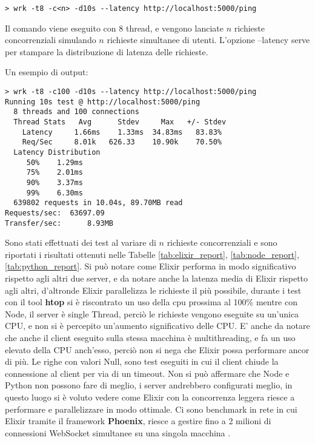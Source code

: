 \begin{lstlisting}[language=none]
> wrk -t8 -c<n> -d10s --latency http://localhost:5000/ping
\end{lstlisting}

Il comando viene eseguito con 8 thread, e vengono lanciate
$n$ richieste concorrenziali simulando $n$ richieste
simultanee di utenti. L'opzione --latency serve per stampare la
distribuzione di latenza delle richieste.

\newpage
Un esempio di output:

\begin{lstlisting}[language=none]
> wrk -t8 -c100 -d10s --latency http://localhost:5000/ping
Running 10s test @ http://localhost:5000/ping
  8 threads and 100 connections
  Thread Stats   Avg      Stdev     Max   +/- Stdev
    Latency     1.66ms    1.33ms  34.83ms   83.83%
    Req/Sec     8.01k   626.33    10.90k    70.50%
  Latency Distribution
     50%    1.29ms
     75%    2.01ms
     90%    3.37ms
     99%    6.30ms
  639802 requests in 10.04s, 89.70MB read
Requests/sec:  63697.09
Transfer/sec:      8.93MB
\end{lstlisting}

Sono stati effettuati dei test al variare di $n$
richieste concorrenziali e sono riportati i risultati
ottenuti nelle Tabelle \ref{tab:elixir_report},
\ref{tab:node_report}, \ref{tab:python_report}.
Si può notare come Elixir performa in modo significativo
rispetto agli altri due server, e da notare anche la latenza media
di Elixir rispetto agli altri, d'altronde Elixir parallelizza
le richieste il più possibile, durante i test con il tool
\textbf{htop} si è riscontrato un uso della cpu prossima al 100\%
mentre con Node, il server è single Thread, perciò le richieste
vengono eseguite su un'unica CPU, e non si è percepito un'aumento
significativo delle CPU. E' anche da notare che anche il client
eseguito sulla stessa macchina è multithreading, e fa un uso
elevato della CPU anch'esso, perciò non si nega che Elixir
possa performare ancor di più.
Le righe con valori Null, sono test eseguiti in
cui il client chiude la connessione al client per via di un timeout.
Non si può affermare che Node e Python non possono
fare di meglio, i server andrebbero configurati meglio,
in questo luogo si è voluto vedere come Elixir con la
concorrenza leggera riesce a performare e parallelizzare
in modo ottimale.
Ci sono benchmark in rete in cui Elixir tramite il
framework \textbf{Phoenix},
riesce a gestire fino a 2 milioni di connessioni
WebSocket simultanee
su una singola macchina \cite{TheRoadt94:online}.

